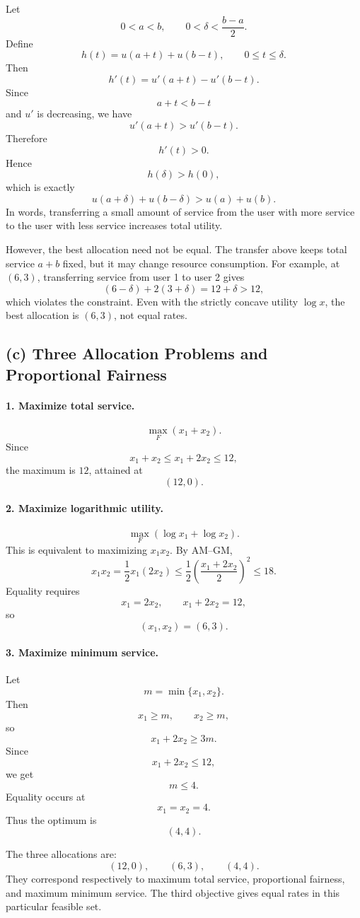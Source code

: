 \documentclass[11pt,a4paper]{article}
\begin{document}
Let
\[
0<a<b,\qquad 0<\delta<\frac{b-a}{2}.
\]
Define
\[
h(t)=u(a+t)+u(b-t),\qquad 0\le t\le \delta.
\]
Then
\[
h'(t)=u'(a+t)-u'(b-t).
\]
Since
\[
a+t<b-t
\]
and \(u'\) is decreasing, we have
\[
u'(a+t)>u'(b-t).
\]
Therefore
\[
h'(t)>0.
\]
Hence
\[
h(\delta)>h(0),
\]
which is exactly
\[
u(a+\delta)+u(b-\delta)>u(a)+u(b).
\]
In words, transferring a small amount of service from the user with more
service to the user with less service increases total utility.

However, the best allocation need not be equal. The transfer above keeps
total service \(a+b\) fixed, but it may change resource consumption. For
example, at \((6,3)\), transferring service from user 1 to user 2 gives
\[
(6-\delta)+2(3+\delta)=12+\delta>12,
\]
which violates the constraint. Even with the strictly concave utility
\(\log x\), the best allocation is \((6,3)\), not equal rates.

\subsection*{(c) Three Allocation Problems and Proportional Fairness}

\paragraph{1. Maximize total service.}
\[
\max_F (x_1+x_2).
\]
Since
\[
x_1+x_2\le x_1+2x_2\le 12,
\]
the maximum is \(12\), attained at
\[
(12,0).
\]

\paragraph{2. Maximize logarithmic utility.}
\[
\max_F(\log x_1+\log x_2).
\]
This is equivalent to maximizing \(x_1x_2\). By AM--GM,
\[
x_1x_2=\frac12 x_1(2x_2)
\le \frac12\left(\frac{x_1+2x_2}{2}\right)^2
\le 18.
\]
Equality requires
\[
x_1=2x_2,\qquad x_1+2x_2=12,
\]
so
\[
(x_1,x_2)=(6,3).
\]

\paragraph{3. Maximize minimum service.}
Let
\[
m=\min\{x_1,x_2\}.
\]
Then
\[
x_1\ge m,\qquad x_2\ge m,
\]
so
\[
x_1+2x_2\ge 3m.
\]
Since
\[
x_1+2x_2\le 12,
\]
we get
\[
m\le 4.
\]
Equality occurs at
\[
x_1=x_2=4.
\]
Thus the optimum is
\[
(4,4).
\]

The three allocations are:
\[
(12,0),\qquad (6,3),\qquad (4,4).
\]
They correspond respectively to maximum total service, proportional
fairness, and maximum minimum service. The third objective gives equal
rates in this particular feasible set.
\end{document}
